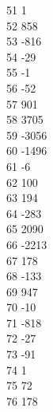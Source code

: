 { 51	1 \\
 52	858 \\
 53	-816 \\
 54	-29 \\
 55	-1 \\
 56	-52 \\
 57	901 \\
 58	3705 \\
 59	-3056 \\
 60	-1496 \\
 61	-6 \\
 62	100 \\
 63	194 \\
 64	-283 \\
 65	2090 \\
 66	-2213 \\
 67	178 \\
 68	-133 \\
 69	947 \\
 70	-10 \\
 71	-818 \\
 72	-27 \\
 73	-91 \\
 74	1 \\
 75	72 \\
 76	178 \\
}
